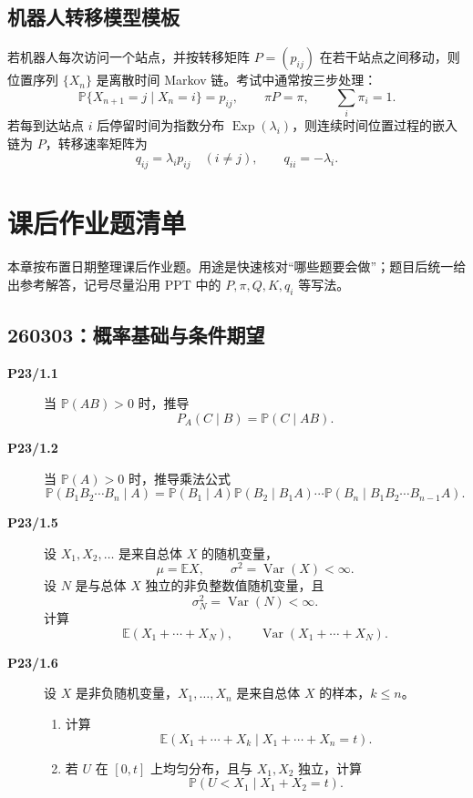 \documentclass[12pt,a4paper,openany]{ctexrep}
\theoremstyle{definition}
\newcommand{\E}{\mathbb{E}}
\newcommand{\Var}{\operatorname{Var}}
\newcommand{\Pp}{\mathbb{P}}
\newcommand{\Exp}{\operatorname{Exp}}
\begin{document}
\section{机器人转移模型模板}

若机器人每次访问一个站点，并按转移矩阵 $P=(p_{ij})$ 在若干站点之间移动，则位置序列 $\{X_n\}$ 是离散时间 Markov 链。考试中通常按三步处理：
\[
\Pp\{X_{n+1}=j\mid X_n=i\}=p_{ij},\qquad
\pi P=\pi,\qquad \sum_i\pi_i=1.
\]
若每到达站点 $i$ 后停留时间为指数分布 $\Exp(\lambda_i)$，则连续时间位置过程的嵌入链为 $P$，转移速率矩阵为
\[
q_{ij}=\lambda_i p_{ij}\quad(i\ne j),\qquad
q_{ii}=-\lambda_i.
\]

\chapter{课后作业题清单}

本章按布置日期整理课后作业题。用途是快速核对“哪些题要会做”；题目后统一给出参考解答，记号尽量沿用 PPT 中的 $P,\pi,Q,K,q_i$ 等写法。

\section{260303：概率基础与条件期望}

\begin{description}
	\item[\textbf{P23/1.1}] 当 $\Pp(AB)>0$ 时，推导
	\[
	P_A(C\mid B)=\Pp(C\mid AB).
	\]
	\item[\textbf{P23/1.2}] 当 $\Pp(A)>0$ 时，推导乘法公式
	\[
	\Pp(B_1B_2\cdots B_n\mid A)
	=
	\Pp(B_1\mid A)\Pp(B_2\mid B_1A)\cdots
	\Pp(B_n\mid B_1B_2\cdots B_{n-1}A).
	\]
	\item[\textbf{P23/1.5}] 设 $X_1,X_2,\dots$ 是来自总体 $X$ 的随机变量，
	\[
	\mu=\E X,\qquad \sigma^2=\Var(X)<\infty.
	\]
	设 $N$ 是与总体 $X$ 独立的非负整数值随机变量，且
	\[
	\sigma_N^2=\Var(N)<\infty.
	\]
	计算
	\[
	\E(X_1+\cdots+X_N),\qquad
	\Var(X_1+\cdots+X_N).
	\]
	\item[\textbf{P23/1.6}] 设 $X$ 是非负随机变量，$X_1,\dots,X_n$ 是来自总体 $X$ 的样本，$k\le n$。
	\begin{enumerate}[label=(\alph*)]
		\item 计算
		\[
		\E(X_1+\cdots+X_k\mid X_1+\cdots+X_n=t).
		\]
		\item 若 $U$ 在 $[0,t]$ 上均匀分布，且与 $X_1,X_2$ 独立，计算
		\[
		\Pp(U<X_1\mid X_1+X_2=t).
		\]
	\end{enumerate}
\end{description}
\end{document}
